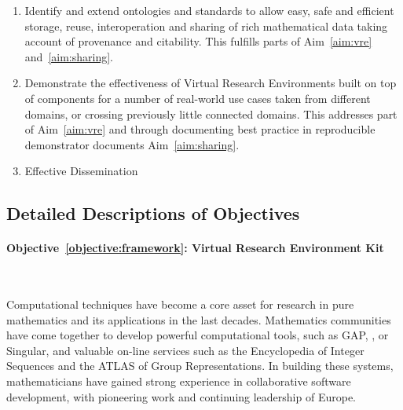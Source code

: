 \documentclass[noworkareas,deliverables,keys]{euproposal}                  %
\begin{document}
\begin{proposal}
\begin{enumerate}
\item \label{objective:data}Identify and extend ontologies and standards to
  allow easy, safe and efficient storage, reuse, interoperation and sharing of rich mathematical
  data taking account of provenance and citability. This fulfills
  parts of Aim~\ref{aim:vre} and~\ref{aim:sharing}.

\item \label{objective:demo}Demonstrate the effectiveness of Virtual
  Research Environments built on top of \TheProject components for a
  number of real-world use cases taken from different domains, or
  crossing previously little connected domains. This addresses part of
  Aim~\ref{aim:vre} and through documenting best practice in 
  reproducible demonstrator documents Aim~\ref{aim:sharing}.

\item \label{objective:disseminate}Effective Dissemination

\end{enumerate}

\subsection*{Detailed Descriptions of Objectives} %

\paragraph{Objective~\ref{objective:framework}: Virtual Research
  Environment Kit}\ 

Computational techniques have become a core asset for research in pure
  mathematics and its applications in the last decades. Mathematics
  communities have come together to develop powerful computational
  tools, such as GAP, \PariGP, \Sage or Singular, and valuable on-line
  services such as the Encyclopedia of Integer Sequences and the ATLAS
  of Group Representations.  In building these systems, 
  mathematicians have gained strong
  experience in collaborative software development, with pioneering
  work and continuing leadership of Europe.


\end{proposal}
\end{document}
